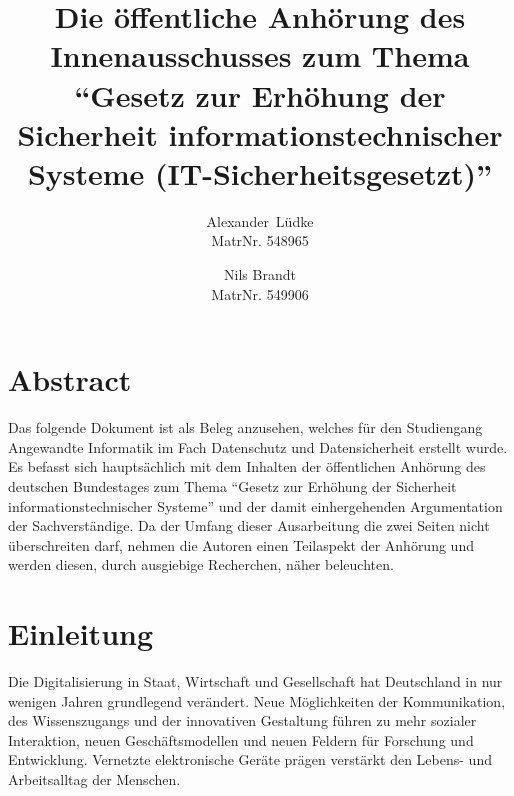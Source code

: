 \documentclass[a4paper,letterpaper,twocolumn,10pt,ngerman]{article}
\begin{document}
%
%

\date{}

\title{\Large \bf Die öffentliche Anhörung des Innenausschusses zum Thema "`Gesetz zur Erhöhung der Sicherheit informationstechnischer Systeme (IT-Sicherheitsgesetzt)"'}

\author{
{\rm Alexander\ Lüdke}\\
MatrNr. 548965
\and
{\rm Nils Brandt}\\
MatrNr. 549906
}

\maketitle

\thispagestyle{empty}

%
%

\section*{Abstract}
\label{sec:Abstract}
Das folgende Dokument ist als Beleg anzusehen, welches für den Studiengang Angewandte Informatik im Fach Datenschutz und Datensicherheit erstellt wurde. Es befasst sich hauptsächlich mit dem Inhalten der öffentlichen Anhörung des deutschen Bundestages zum Thema "`Gesetz zur Erhöhung der Sicherheit informationstechnischer Systeme"'  und der damit einhergehenden Argumentation der Sachverständige. Da der Umfang dieser Ausarbeitung die zwei Seiten nicht überschreiten darf, nehmen die Autoren einen Teilaspekt der Anhörung und werden diesen, durch ausgiebige Recherchen, näher beleuchten. 

\section{Einleitung}
\label{sec:Einleitung} 
Die Digitalisierung in Staat, Wirtschaft und Gesellschaft hat Deutschland in nur wenigen Jahren grundlegend verändert. Neue Möglichkeiten der Kommunikation, des Wissenszugangs und der innovativen Gestaltung führen zu mehr sozialer Interaktion, neuen Geschäftsmodellen und neuen Feldern für Forschung und Entwicklung. Vernetzte elektronische Geräte prägen verstärkt den Lebens- und Arbeitsalltag der Menschen.
\end{document}
